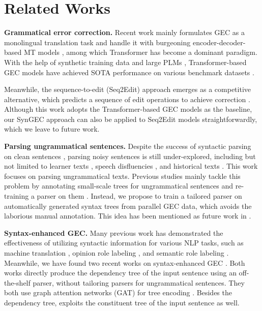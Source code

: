 \documentclass[11pt]{article}
\begin{document}
 
\section{Related Works}
\label{relate}

\textbf{Grammatical error correction.} 
Recent work mainly formulates GEC as a monolingual translation task and handle it with burgeoning encoder-decoder-based MT models \citep{yuan2016grammatical, junczys2018approaching}, among which Transformer \citep{vaswani2017attention} has become a dominant paradigm. With the help of synthetic training data  \citep{lichtarge2019corpora, DBLP:conf/emnlp/YasunagaLL21} and large PLMs \citep{kaneko2020encoder, katsumata2020stronger}, Transformer-based GEC models have achieved SOTA performance on various benchmark datasets \citep{rothe2021recipe,stahlberg2021synthetic}. 


Meanwhile, the sequence-to-edit (Seq2Edit) approach emerges as a competitive alternative, which predicts a sequence of edit operations to achieve correction \citep{gu2019levenshtein,awasthi2019parallel,omelianchuk2020gector}. 
Although this work adopts the Transformer-based GEC models as the baseline, our SynGEC approach can also be applied to Seq2Edit models straightforwardly, which we leave to future work. 


\textbf{Parsing ungrammatical sentences.} Despite the success of syntactic parsing on clean sentences \citep{DBLP:conf/iclr/DozatM17, DBLP:conf/acl/ZhangLZ20}, parsing noisy sentences is still under-explored, including but not limited to learner texts \citep{DBLP:conf/lrec/Foster04,hashemi2016evaluation}, speech disfluencies \cite{honnibal2014joint}, and historical texts \cite{pettersson2012parsing}. This work focuses on parsing ungrammatical texts. Previous studies mainly tackle this problem by annotating small-scale trees for ungrammatical sentences and re-training a parser on them \citep{dickinson2009dependency,petrov2012overview,cahill2015parsing,DBLP:conf/acl/BerzakKSWLMGK16}. 
Instead, we propose to train a tailored parser on automatically generated syntax trees from parallel GEC data, which avoids the laborious manual annotation. This idea has been mentioned as future work in \citet{wagner2012detecting}.







\textbf{Syntax-enhanced GEC.} 
Many previous work has demonstrated the effectiveness of utilizing syntactic information for various NLP tasks,  such as machine translation \citep{bastings-etal-2017-graph,DBLP:conf/naacl/ZhangLFZ19}, opinion role labeling \citep{DBLP:conf/acl/ZhangZWLZ20}, and semantic role labeling \citep{xia2019syntax,sachan2021syntax}.
Meanwhile, we have found two recent works on syntax-enhanced GEC \citep{wan2021syntax,li2022syntax}.  Both works directly produce the dependency tree of the input sentence using an off-the-shelf parser, without tailoring parsers for ungrammatical sentences. 
They both use graph attention networks (GAT) for tree encoding \citep{DBLP:conf/iclr/VelickovicCCRLB18}. 
Besides the dependency tree, \citet{li2022syntax} exploits the constituent tree of the input sentence as well.  
\end{document}
